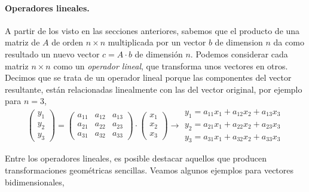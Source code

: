 \paragraph{Operadores lineales.} A partir de los visto en las secciones anteriores, sabemos que el producto de una matriz de $A$ de orden $n\times n$  multiplicada por un vector $b$ de dimension $n$ da como resultado un nuevo vector $c=A\cdot b$  de dimensión $n$. Podemos considerar cada matriz $n\times n$ como un \emph{operador lineal}, que transforma unos vectores en otros.  Decimos que se trata de un operador lineal porque las componentes del vector resultante, están relacionadas linealmente con las del vector original, por ejemplo para $n=3$,
\begin{equation*}
\begin{pmatrix}
y_1\\
y_2\\
y_3
\end{pmatrix}=\begin{pmatrix}
a_{11}& a_{12}& a_{13}\\
a_{21}& a_{22}& a_{23}\\
a_{31}& a_{32}& a_{33}
\end{pmatrix} \cdot
\begin{pmatrix}
x_1\\
x_2\\
x_3
\end{pmatrix} \rightarrow \begin{matrix}
y_1=a_{11}x_1+a_{12}x_2+a_{13}x_3\\
y_2=a_{21}x_1+a_{22}x_2 +a_{23}x_3\\
y_3=a_{31}x_1+a_{32}x_2+a_{33}x_3
\end{matrix} 
\end{equation*}

Entre los operadores lineales, es posible destacar aquellos que producen transformaciones geométricas sencillas. Veamos algunos ejemplos para vectores bidimensionales,


